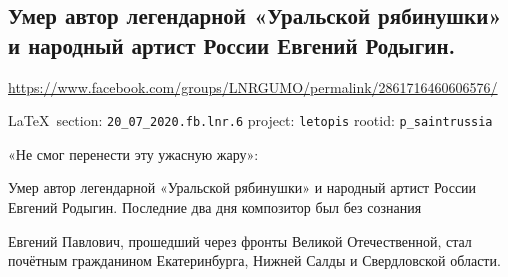  
 

\subsection{Умер автор легендарной «Уральской рябинушки» и народный артист России Евгений Родыгин.}
\url{https://www.facebook.com/groups/LNRGUMO/permalink/2861716460606576/}
  
\vspace{0.5cm}
{\small\LaTeX~section: \verb|20_07_2020.fb.lnr.6| project: \verb|letopis| rootid: \verb|p_saintrussia|}
\vspace{0.5cm}

«Не смог перенести эту ужасную жару»:

Умер автор легендарной «Уральской рябинушки» и народный артист России Евгений Родыгин.
Последние два дня композитор был без сознания

Евгений Павлович, прошедший через фронты Великой Отечественной, стал почётным гражданином Екатеринбурга, Нижней Салды и Свердловской области. 
